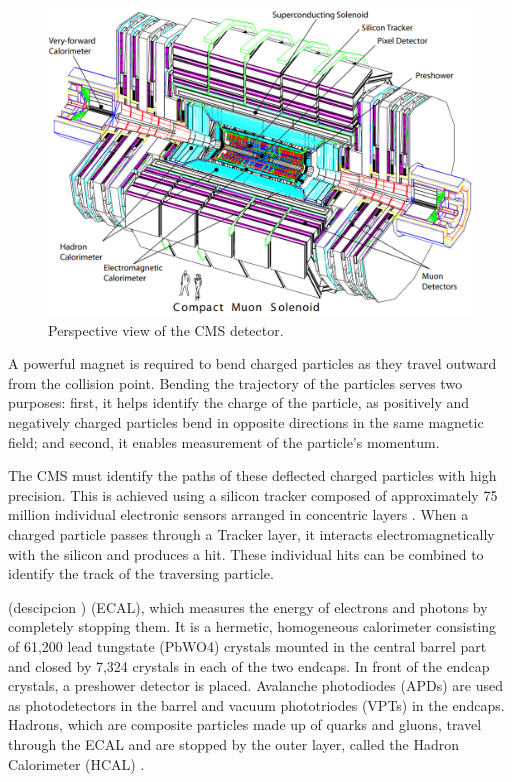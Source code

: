 \begin{center}
  \begin{figure}[ht]
    \centering
    \includegraphics[scale=.3]{Chapter2/CMS_detector_simple.png}
    \caption[Perspective view of the CMS detector]{Perspective view of the CMS detector.}
    \label{detector_CMS}
  \end{figure}
\end{center}

A powerful magnet is required to bend charged particles as they travel outward from the collision point. Bending the trajectory of the particles serves two purposes: first, it helps identify the charge of the particle, as positively and negatively charged particles bend in opposite directions in the same magnetic field; and second, it enables measurement of the particle's momentum.

The CMS must identify the paths of these deflected charged particles with high precision. This is achieved using a silicon tracker composed of approximately 75 million individual electronic sensors arranged in concentric layers \cite{CMS_Exp_2008}. When a charged particle passes through a Tracker layer, it interacts electromagnetically with the silicon and produces a hit. These individual hits can be combined to identify the track of the traversing particle.

(descipcion )
(ECAL), which measures the energy of electrons and photons by completely stopping them. It is a hermetic, homogeneous calorimeter consisting of 61,200 lead tungstate (PbWO4) crystals mounted in the central barrel part and closed by 7,324 crystals in each of the two endcaps. In front of the endcap crystals, a preshower detector is placed. Avalanche photodiodes (APDs) are used as photodetectors in the barrel and vacuum phototriodes (VPTs) in the endcaps. Hadrons, which are composite particles made up of quarks and gluons, travel through the ECAL and are stopped by the outer layer, called the Hadron Calorimeter (HCAL) \cite{det_summary}.

